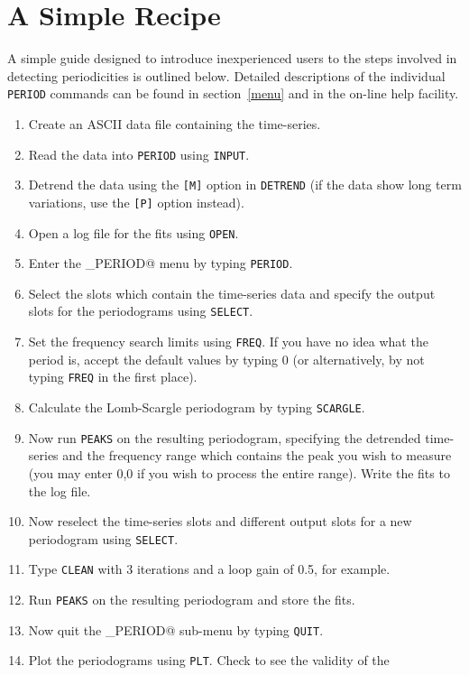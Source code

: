 \section{A Simple Recipe}
\label{recipe}

A simple guide designed to introduce inexperienced users to the steps involved 
in detecting periodicities is outlined below. Detailed descriptions of the
individual {\tt PERIOD} commands can be found in section~\ref{menu} and in
the on-line help facility.

\begin{enumerate}
\item Create an ASCII data file containing the time-series.
\item Read the data into {\tt PERIOD} using {\tt INPUT}. 
\item Detrend the data using the {\tt [M]} option in {\tt DETREND} (if the
data show long term variations, use the {\tt [P]} option instead).
\item Open a log file for the fits using {\tt OPEN}. 
\item Enter the \verb@PERIOD_PERIOD@ menu by typing {\tt PERIOD}.
\item Select the slots which contain the time-series data and specify the output
slots for the periodograms using {\tt SELECT}.
\item Set the frequency search limits using {\tt FREQ}. If you have no idea
what the period is, accept the default values by typing 0 (or alternatively, 
by not typing {\tt FREQ} in the first place). 
\item Calculate the Lomb-Scargle periodogram by typing {\tt SCARGLE}.
\item Now run {\tt PEAKS} on the resulting periodogram, specifying the detrended
time-series and the frequency range which contains the peak you wish to 
measure (you may enter 0,0 if you wish to process the entire range). Write 
the fits to the log file.
\item Now reselect the time-series slots and different output slots for a new
periodogram using {\tt SELECT}.
\item Type {\tt CLEAN} with 3 iterations and a loop gain of 0.5, for example.
\item Run {\tt PEAKS} on the resulting periodogram and store the fits.
\item Now quit the \verb@PERIOD_PERIOD@ sub-menu by typing {\tt QUIT}.
\item Plot the periodograms using {\tt PLT}. Check to see the validity of the

\end{enumerate}
